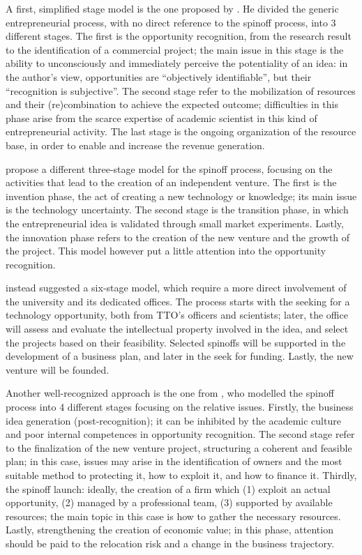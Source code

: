 A first, simplified stage model is the one proposed by \citet{Druilhe2004}. He divided the generic entrepreneurial process, with no direct reference to the spinoff process, into 3 different stages. The first is the opportunity recognition, from the research result to the identification of a commercial project; the main issue in this stage is the ability to unconsciously and immediately perceive the potentiality of an idea: in the author's view, opportunities are \enquote{objectively identifiable}, but their \enquote{recognition is subjective}. The second stage refer to the mobilization of resources and their (re)combination to achieve the expected outcome; difficulties in this phase arise from the scarce expertise of academic scientist in this kind of entrepreneurial activity. The last stage is the ongoing organization of the resource base, in order to enable and increase the revenue generation.

\citet{Clarysse2005} propose a different three-stage model for the spinoff process, focusing on the activities that lead to the creation of an independent venture. The first is the invention phase, the act of creating a new technology or knowledge; its main issue is the technology uncertainty. The second stage is the transition phase, in which the entrepreneurial idea is validated through small market experiments. Lastly, the innovation phase refers to the creation of the new venture and the growth of the project. This model however put a little attention into the opportunity recognition.

\citet{Degroof2002} instead suggested a six-stage model, which require a more direct involvement of the university and its dedicated offices. The process starts with the seeking for a technology opportunity, both from TTO's officers and scientists; later, the office will assess and evaluate the intellectual property involved in the idea, and select the projects based on their feasibility. Selected spinoffs will be supported in the development of a business plan, and later in the seek for funding. Lastly, the new venture will be founded.

Another well-recognized approach is the one from \citet{Ndonzuau2002}, who modelled the spinoff process into 4 different stages focusing on the relative issues. Firstly, the business idea generation (post-recognition); it can be inhibited by the academic culture and poor internal competences in opportunity recognition. The second stage refer to the finalization of the new venture project, structuring a coherent and feasible plan; in this case, issues may arise in the identification of owners and the most suitable method to protecting it, how to exploit it, and how to finance it. Thirdly, the spinoff launch: ideally, the creation of a firm which (1) exploit an actual opportunity, (2) managed by a professional team, (3) supported by available resources; the main topic in this case is how to gather the necessary resources. Lastly, strengthening the creation of economic value; in this phase, attention should be paid to the relocation risk and a change in the business trajectory.

